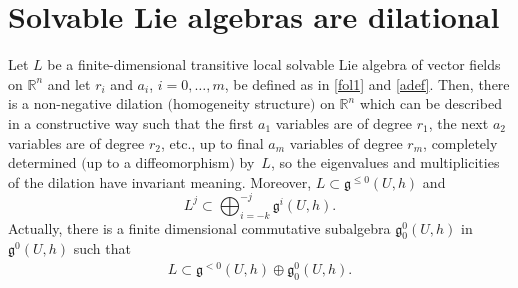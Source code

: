 \section{Solvable Lie algebras are dilational}
\begin{Theorem}\label{main}
Let $L$ be a finite-dimensional transitive local solvable Lie algebra of vector fields on ${\mathbb R}^n$ and let $r_i$ and $a_i$, $i=0,\dots,m$, be defined as in \eqref{fol1} and \eqref{adef}. Then, there is a non-negative dilation $($homogeneity structure$)$ on ${\mathbb R}^n$ which can be described in a constructive way such that the first $a_1$ variables are of degree $r_1$, the next $a_2$ variables are of degree $r_2$, etc., up to final $a_m$ variables of degree $r_m$, completely determined $($up to a diffeomorphism$)$ by~$L$, so the eigenvalues and multiplicities of the dilation have invariant meaning.
Moreover, $L\subset\mathfrak{g}^{\le 0}(U,h)$ and
$$L^j\subset \bigoplus_{i=-k}^{-j}\mathfrak{g}^i(U,h) .$$
Actually, there is a finite dimensional commutative subalgebra $\mathfrak{{g}}^{0}_0(U,h)$ in $\mathfrak{{g}}^{0}(U,h)$ such that
\begin{gather}\label{solv} L \subset \mathfrak{g}^{<0}(U,h)\oplus \mathfrak{g}_0^{0}(U,h) .
\end{gather}
\end{Theorem}
